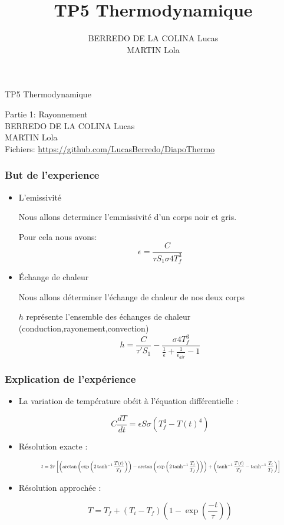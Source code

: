 \documentclass{beamer}
\title{TP5 Thermodynamique}
\author{BERREDO DE LA COLINA Lucas\\ MARTIN Lola}
\date{}
\begin{document}
\begin{frame}
\vfill
\Huge{TP5 Thermodynamique}

\Large{Partie 1: Rayonnement}
\\[2em]
\large{BERREDO DE LA COLINA Lucas\\ MARTIN Lola}
\\[2em]
{\small Fichiers: \url{https://github.com/LucasBerredo/DiapoThermo}}

\end{frame}





\begin{frame}
\frametitle{But de l'experience}

\begin{itemize}
	\item{L'emissivité}
    

    Nous allons determiner l'emmissivité d'un corps noir et gris.

    Pour cela nous avons:
    \[
    \epsilon = \frac{C}{\tau S_1 \sigma 4 T_f^3}
    \]

    \item{Échange de chaleur}

    
    Nous allons déterminer l'échange de chaleur de nos deux corps
    
    $h$ représente l'ensemble des échanges de chaleur (conduction,rayonement,convection)
    \[
    h= \frac{C}{\tau' S_1}-\frac{\sigma 4 T_f^3}{\frac{1}{\epsilon}+\frac{1}{\epsilon_{air}}-1}
    \]

\end{itemize}

\end{frame}





\begin{frame}
\frametitle{Explication de l'expérience}

\begin{itemize}
    \item La variation de température obéit à l'équation différentielle :

    \[
    C \frac{dT}{dt} = \epsilon S \sigma \left( T_f^4 - T(t)^4 \right)
    \]

    \item Résolution exacte :

    \[
    \scalebox{0.62}{
    $\displaystyle
    t = 2\tau \left[
    \left( \arctan\left( \exp\left( 2 \tanh^{-1} \frac{T(t)}{T_f} \right) \right)
    - \arctan\left( \exp\left( 2 \tanh^{-1} \frac{T_i}{T_f} \right) \right) \right)
    + \left( \tanh^{-1} \frac{T(t)}{T_f} - \tanh^{-1} \frac{T_i}{T_f} \right)
    \right]
    $}
    \]

    \item Résolution approchée :

    \[
    T = T_f + (T_i - T_f) \left( 1 - \exp\left( \frac{-t}{\tau} \right) \right)
    \]

\end{itemize}
\end{frame}
\end{document}
